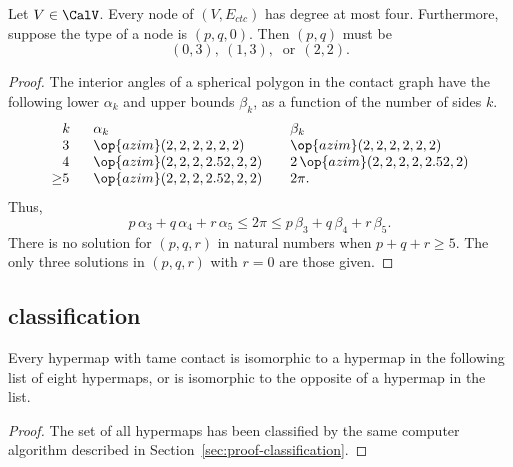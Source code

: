 \begin{lemma}[]\label{lemma:no-5} 
  Let $V\in \CalV$.  Every node of $(V,E_{ctc})$ has degree at most
  four.  Furthermore, suppose the type of a node is $(p,q,0)$.  Then
  $(p,q)$ must be
\begin{displaymath}
(0,3),~(1,3),~\text{ or}~~(2,2).
\end{displaymath}
\end{lemma}

\begin{proof} The interior angles of a spherical polygon in the
  contact graph have the following lower $\alpha_k$ and upper bounds
  $\beta_k$, as a function of the number of sides $k$.
\[
\begin{array}{llll}
  \phantom{\ge}k~~&\alpha_k & \beta_k\\
  \phantom{\ge}3~~&\op{azim}(2,2,2,2,2,2)  &\op{azim}(2,2,2,2,2,2)\\
  \phantom{\ge}4~~&\op{azim}(2,2,2,2.52,2,2) &2\,\op{azim}(2,2,2,2,2.52,2)\\
  {\ge}5~~& \op{azim}(2,2,2,2.52,2,2) ~~~& 2\pi.
\end{array}
\]
Thus,
\begin{displaymath}
  p\,\alpha_3 + q\,\alpha_4 +r\, \alpha_5 
\le 2\pi \le p\,\beta_3 + q\,\beta_4 + r \,\beta_5.
\end{displaymath}
There is no solution for
$(p,q,r)$ in natural numbers when $p+q+r\ge 5$.
The only three solutions in $(p,q,r)$ with $r=0$
are those given. 
\end{proof}



\subsection{classification}


\begin{lemma}
  \label{lemma:contact-classification} Every hypermap with tame
  contact is isomorphic to a hypermap in the following list of eight
  hypermaps, or is isomorphic to the opposite of a hypermap in the
  list.  %
\end{lemma}

\begin{proof}
  The set of all hypermaps has been classified by the same computer
  algorithm described in Section~\ref{sec:proof-classification}.
\end{proof}




